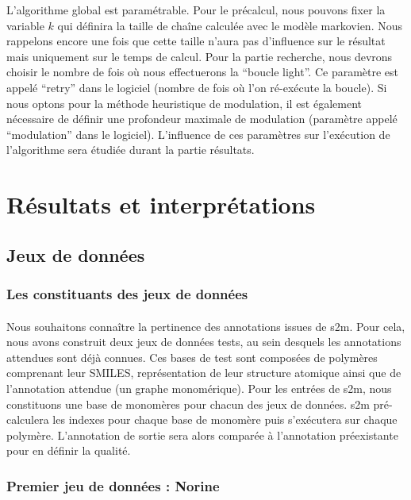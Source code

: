 \documentclass[12pt,french,twoside]{report}
\begin{document}
L'algorithme global est paramétrable.
Pour le précalcul, nous pouvons fixer la variable $k$ qui définira la taille de chaîne calculée avec le modèle markovien.
Nous rappelons encore une fois que cette taille n'aura pas d'influence sur le résultat mais uniquement sur le temps de calcul.
Pour la partie recherche, nous devrons choisir le nombre de fois où nous effectuerons la ``boucle light''.
Ce paramètre est appelé ``retry'' dans le logiciel (nombre de fois où l'on ré-exécute la boucle).
Si nous optons pour la méthode heuristique de modulation, il est également nécessaire de définir une profondeur maximale de modulation (paramètre appelé ``modulation'' dans le logiciel).
L'influence de ces paramètres sur l'exécution de l'algorithme sera étudiée durant la partie résultats.




\section{Résultats et interprétations}

\subsection{Jeux de données}

\subsubsection{Les constituants des jeux de données}

\paragraph{}Nous souhaitons connaître la pertinence des annotations issues de s2m.
Pour cela, nous avons construit deux jeux de données tests, au sein desquels les annotations attendues sont déjà connues.
Ces bases de test sont composées de polymères comprenant leur SMILES, représentation de leur structure atomique ainsi que de l'annotation attendue (un graphe monomérique).
Pour les entrées de s2m, nous constituons une base de monomères pour chacun des jeux de données.
s2m pré-calculera les indexes pour chaque base de monomère puis s'exécutera sur chaque polymère.
L'annotation de sortie sera alors comparée à l'annotation préexistante pour en définir la qualité.


\subsubsection{Premier jeu de données : Norine}
\end{document}
